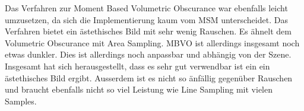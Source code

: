 \documentclass[runningheaders,a4paper]{llncs}
\begin{document}
Das Verfahren zur Moment Based Volumetric Obscurance war ebenfalls leicht umzusetzen, da sich die Implementierung kaum vom MSM unterscheidet. Das Verfahren bietet ein ästethisches Bild mit sehr wenig Rauschen. Es ähnelt dem Volumetric Obscurance mit Area Sampling.
MBVO ist allerdings insgesamt noch etwas dunkler. Dies ist allerdings noch anpassbar und abhängig von der Szene. Insgesamt hat sich herausgestellt, dass es sehr gut verwendbar ist ein ein ästethisches Bild ergibt. Ausserdem ist es nicht so änfällig gegenüber Rauschen und braucht ebenfalls nicht so viel Leistung wie Line Sampling mit vielen Samples.



\end{document}

